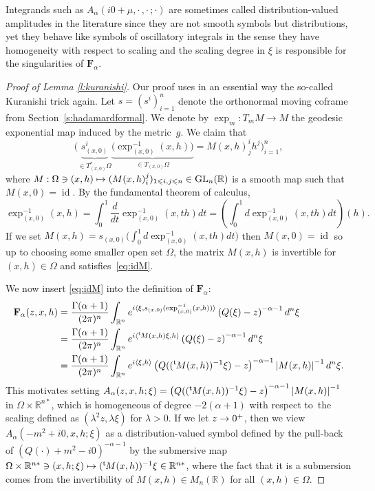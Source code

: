 \documentclass[10pt]{amsart}
\def\mto{\mathchoice{\longmapsto}{\mapsto}{\mapsto}{\mapsto}}
\theoremstyle{definition}
\newenvironment{refproof}[1]{\begin{proof}[Proof of {#1}]}{\end{proof}}
\newcommand{\GL}{\mathrm{GL}}
\let\cv\alpha
\let\Im\relax
\DeclareMathOperator{\Im}{Im}
\DeclareMathOperator\id{id}
\newcommand{\module}[1]{\left|#1\right|}
\renewcommand{\sec}[1]{Section~\ref{#1}}
\renewcommand{\t}{{{}^{\mathrm{t}\mkern-2mu}}}
\begin{document}
Integrands such as $A_\cv(i0+\mu,\cdot\,,\cdot\,;\cdot)$ are sometimes called distribution-valued amplitudes in the literature since they are not smooth symbols but distributions, yet they behave like symbols of oscillatory integrals in the sense they have homogeneity with respect to scaling and the scaling degree in $\xi$ is responsible for the singularities of $\mathbf{F}_\cv$.

\begin{refproof}{Lemma \ref{l:kuranishi}}
Our proof uses in an essential way the so-called Kuranishi trick again.
Let $s=(s^i)_{i=1}^n$ denote the orthonormal moving {coframe} from
\sec{s:hadamardformal}.
We denote by $\exp_{m}:T_mM\to M$ the geodesic exponential
map induced by the metric~$g$.
We claim that
\begin{equation}\label{eq:idM}
\Big(\underset{\in T^*_{(x,0)}\Omega}{\underbrace{s^i_{(x,0)}}}
\underset{\in T_{(x,0)}\Omega}{\underbrace{\bigl(\exp^{-1}_{(x,0)}(x,h)\bigr)}}= M(x,h)^i_jh^j\Big)_{i=1}^n,
\end{equation}
where
$M:\Omega \ni (x,h)\mto (M(x,h)_i^j)_{1\leqslant i,j\leqslant n}\in \GL_n(\mathbb{R})$ is a smooth map
such that $M(x,0)=\id$.
By the fundamental theorem of calculus,
\[
\exp^{-1}_{(x,0)}(x,h)=\int_{0}^1 \frac{d}{dt} \exp^{-1}_{(x,0)}(x,th) dt =\left(\int_{0}^1 d\exp^{-1}_{(x,0)}(x,th) dt\right)(h).
\]
If we set $M(x,h)=s_{(x,0)}\bigl(\int_{0}^1 d\exp^{-1}_{(x,0)}(x,th) dt\bigr)$ then $M(x,0)=\id$
so up to choosing some smaller open set $\Omega$, the matrix $M(x,h)$ is
invertible for $(x,h)\in \Omega$ and satisfies~\eqref{eq:idM}.

We now insert \eqref{eq:idM} into the definition of $\mathbf{F}_\cv$:
\[
\begin{aligned}
\mathbf{F}_\cv(z,x,h)&=\frac{\Gamma(\cv+1)}{(2\pi)^n}\int_{\mathbb{R}^n} e^{i\langle\xi,s_{(x,0)}(\exp^{-1}_{(x,0)}(x,h))\rangle} \left(Q(\xi)-z \right)^{-\cv-1} d^n\xi\\
&=\frac{\Gamma(\cv+1)}{(2\pi)^n}\int_{\mathbb{R}^n} e^{i\langle \t M(x,h)\xi,h\rangle} \left(Q(\xi)-z \right)^{-\cv-1} d^n\xi
\\
&=\frac{\Gamma(\cv+1)}{(2\pi)^n}\int_{\mathbb{R}^n} e^{i\left\langle \xi,h\right\rangle} \left(Q((\t M(x,h))^{-1}\xi)-z \right)^{-\cv-1} \module{M(x,h)}^{-1} d^n\xi.
\end{aligned}
\]
This motivates setting
$A_\cv(z,x,h;\xi)=\left(Q((\t M(x,h))^{-1}\xi)-z \right)^{-\cv-1} \module{M(x,h)}^{-1}$
in $\Omega\times \mathbb{R}^{n*}$, which is homogeneous of degree $-2(\cv+1)$ with respect to~the scaling defined as $(\lambda^2z,\lambda\xi)$ for $\lambda>0$. If we let $\Im z\to 0^+$, then we view $A_\cv(-m^2+i0,x,h;\xi)$ as a distribution-valued symbol defined by the pull-back of
$\left(Q(\cdot)+m^2-i0\right)^{-\cv-1}$ by the submersive map
$\Omega\times \mathbb{R}^{n*} \ni (x,h;\xi) \mto (\t M(x,h))^{-1}\xi\in \mathbb{R}^{n*}$, where the fact that it is a submersion comes from the invertibility of $M(x,h)\in M_n(\mathbb{R})$ for all $(x,h)\in \Omega$.


\end{refproof}
\end{document}
